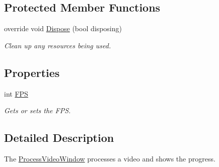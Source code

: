 \subsection*{Protected Member Functions}
\begin{DoxyCompactItemize}
\item 
override void \hyperlink{class_a_rdev_kit_1_1_controller_1_1_test_controller_1_1_process_video_window_ac30e02694f12428387eabe473988b245}{Dispose} (bool disposing)
\begin{DoxyCompactList}\small\item\em Clean up any resources being used. \end{DoxyCompactList}\end{DoxyCompactItemize}
\subsection*{Properties}
\begin{DoxyCompactItemize}
\item 
int \hyperlink{class_a_rdev_kit_1_1_controller_1_1_test_controller_1_1_process_video_window_a8f9c4bafd5143ae34f81c5cc11b9a518}{F\-P\-S}
\begin{DoxyCompactList}\small\item\em Gets or sets the F\-P\-S. \end{DoxyCompactList}\end{DoxyCompactItemize}


\subsection{Detailed Description}
The \hyperlink{class_a_rdev_kit_1_1_controller_1_1_test_controller_1_1_process_video_window}{Process\-Video\-Window} processes a video and shows the progress. 



